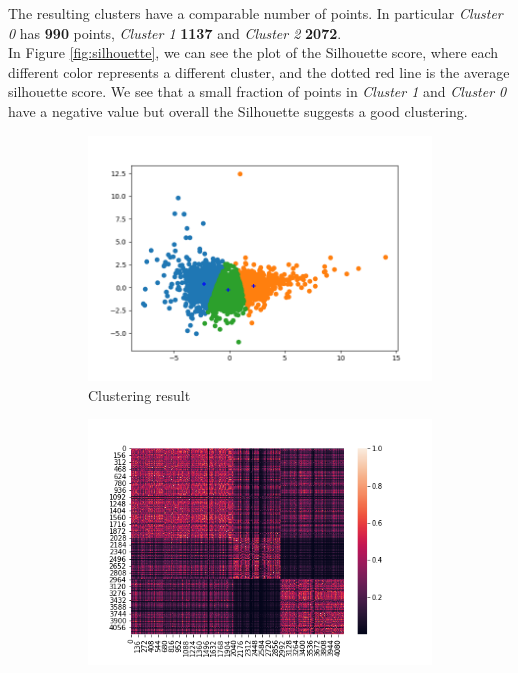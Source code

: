 The resulting clusters have a comparable number of points. In particular \emph{Cluster 0} has \textbf{990} points, \emph{Cluster 1} \textbf{1137} and \emph{Cluster 2} \textbf{2072}.\\
In Figure \ref{fig:silhouette}, we can see the plot of the Silhouette score, where each different color represents a different cluster, and the dotted red line is the average silhouette score. 
We see that a small fraction of points in \emph{Cluster 1} and \emph{Cluster 0} have a negative value but overall the Silhouette suggests a good clustering.

\begin{figure}[h!]
    \centering
    \captionsetup{justification=centering}
    \begin{subfigure}{0.32\textwidth}
        \includegraphics[width=\textwidth]{img/clustering/km_clusters.png}
        \caption{Clustering result}
        \label{fig:skmclust}
    \end{subfigure}
    \begin{subfigure}{0.32\textwidth}
        \includegraphics[width=\textwidth]{img/clustering/sim_heatmap.png}

\end{subfigure}
\end{figure}
